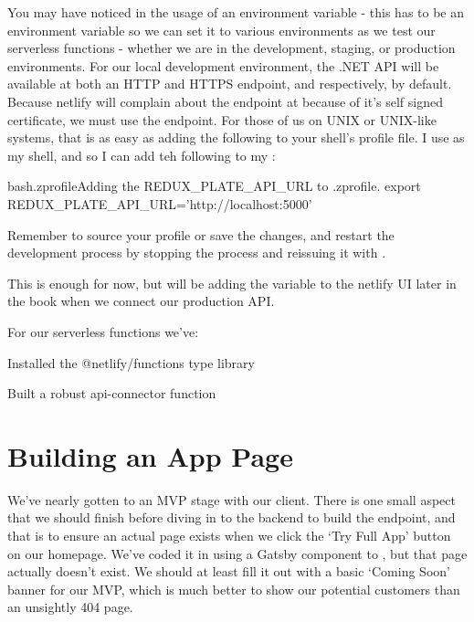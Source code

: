 \documentclass[paper=6in:9in,pagesize=pdftex,headinclude=on,footinclude=on,12pt,twoside]{scrbook}
\begin{document}

You may have noticed in  the usage of an environment variable  - this has to be an environment variable so we can set it to various environments as we test our serverless functions - whether we are in the development, staging, or production environments. For our local development environment, the .NET API will be available at both an HTTP and HTTPS endpoint,  and  respectively, by default. Because netlify will complain about the endpoint at  because of it's self signed certificate, we must use the  endpoint. For those of us on UNIX or UNIX-like systems, that is as easy as adding the following to your shell's profile file. I use  as my shell, and so I can add teh following to my :

\begin{codeInput}{bash}{.zprofile}{Adding the REDUX\_PLATE\_API\_URL to .zprofile.}
export REDUX_PLATE_API_URL='http://localhost:5000'
\end{codeInput}

Remember to source your profile or save the changes, and restart the development process by stopping the  process and reissuing it with .

This is enough for now, but will be adding the  variable to the netlify UI later in the book when we connect our production API.


For our serverless functions we've:

\begin{arrows}
\item Installed the @netlify/functions type library 
\item Built a robust api-connector function
\end{arrows}

\section{Building an App Page}

We've nearly gotten to an MVP stage with our client. There is one small aspect that we should finish before diving in to the backend to build the  endpoint, and that is to ensure an actual page exists when we click the `Try Full App' button on our homepage. We've coded it in using a Gatsby  component to , but that page actually doesn't exist. We should at least fill it out with a basic `Coming Soon' banner for our MVP, which is much better to show our potential customers than an unsightly 404 page.
\end{document}
